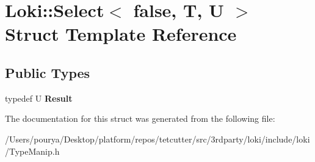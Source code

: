 \hypertarget{structLoki_1_1Select_3_01false_00_01T_00_01U_01_4}{}\section{Loki\+:\+:Select$<$ false, T, U $>$ Struct Template Reference}
\label{structLoki_1_1Select_3_01false_00_01T_00_01U_01_4}
\subsection*{Public Types}
\begin{DoxyCompactItemize}
\item 
\hypertarget{structLoki_1_1Select_3_01false_00_01T_00_01U_01_4_a03c1e6a8c921afc21aff68bd78cf9314}{}typedef U {\bfseries Result}\label{structLoki_1_1Select_3_01false_00_01T_00_01U_01_4_a03c1e6a8c921afc21aff68bd78cf9314}

\end{DoxyCompactItemize}


The documentation for this struct was generated from the following file\+:\begin{DoxyCompactItemize}
\item 
/\+Users/pourya/\+Desktop/platform/repos/tetcutter/src/3rdparty/loki/include/loki/Type\+Manip.\+h\end{DoxyCompactItemize}
